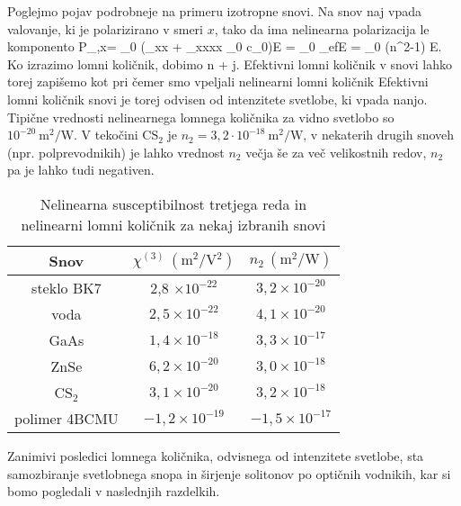 Poglejmo pojav podrobneje na primeru izotropne snovi. Na snov naj vpada valovanje, ki je polarizirano
v smeri $x$, tako da ima nelinearna polarizacija le komponento 
\beq
P_{,x}=
\epsilon_{0} \left(\chi_{xx} + \chi_{xxxx}
{\varepsilon_0  c_0}\right)E = \varepsilon_0 \chi_{ef}E = \varepsilon_0 (n^2-1) E.
\eeq
Ko izrazimo lomni količnik, dobimo
\beq
n \approx {} +  j.
\eeq
Efektivni lomni količnik v snovi lahko torej zapišemo kot 
pri čemer smo vpeljali nelinearni lomni količnik
Efektivni lomni količnik snovi je torej odvisen od intenzitete svetlobe, ki vpada nanjo. 
Tipične vrednosti nelinearnega lomnega količnika za vidno svetlobo so $10^{-20}~\si{\metre^2/\watt}$.
V tekočini CS$_2$ je $n_2 = 3,2 \cdot 10^{-18}~\si{\metre^2/\watt}$, v nekaterih 
drugih snoveh (npr. polprevodnikih) je lahko vrednost $n_2$ večja še za več 
velikostnih redov, $n_2$ pa je lahko tudi negativen. 

\begin{table}[h]
 \centering
\begin{tabular}{|c|c|c|} \hline  
      Snov & $\chi^{(3)}~(\si{\metre^2/\volt^2})$ & $n_2~(\si{\metre^2/\watt})$\\ \hline
     steklo BK7 & 2,8 $\times 10^{-22}$ & $3,2 \times 10^{-20}$ \\ \hline
     voda & $2,5 \times 10^{-22}$ & $4,1 \times 10^{-20}$ \\ \hline
     GaAs & $1,4 \times 10^{-18}$ & $3,3 \times 10^{-17}$ \\ \hline
     ZnSe & $6,2 \times 10^{-20}$ & $3,0 \times 10^{-18}$ \\ \hline
     CS$_2$ & $3,1 \times 10^{-20}$ & $3,2 \times 10^{-18}$ \\ \hline 
     polimer 4BCMU  & $-1,2 \times 10^{-19}$ & $-1,5 \times 10^{-17}$ \\ \hline      
\end{tabular}
  \caption{Nelinearna susceptibilnost tretjega reda in nelinearni lomni količnik za nekaj izbranih snovi}
\label{table:chi3}
\end{table}

Zanimivi posledici lomnega količnika, odvisnega od intenzitete svetlobe, 
sta samozbiranje svetlobnega snopa in širjenje solitonov po optičnih vodnikih, 
kar si bomo pogledali v naslednjih
razdelkih.

